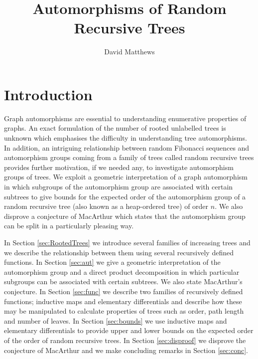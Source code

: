 
\DeclareMathOperator{\F}{\mathcal{F}}
\DeclareMathOperator{\R}{\mathcal{R}}
\DeclareMathOperator{\La}{\mathcal{L}}
\DeclareMathOperator{\V}{\mathcal{V}}
\DeclareMathOperator{\Aut}{Aut}
\usepackage{amssymb}
\title{Automorphisms of Random Recursive Trees}
\author{David Matthews}

\maketitle
\section{Introduction}
Graph automorphisms are essential to understanding enumerative properties of graphs.  An exact formulation of 
the number of rooted unlabelled trees is unknown \cite{harary} which emphasises the difficulty in understanding tree automorphisms.  
In addition, an intriguing 
relationship between random Fibonacci sequences and automorphism groups coming from a family of trees called random recursive 
trees \cite{macarthur2006} 
provides further motivation, if we needed any, to investigate automorphism groups of trees.  We exploit a geometric interpretation of 
a graph automorphism in which subgroups of the automorphism group are associated with certain subtrees to give bounds for the 
expected order of the automorphism group of a random recursive tree (also known as a heap-ordered tree) of order $n$. We also disprove a conjecture of MacArthur 
\cite{macarthur} which states that the automorphism group can be split in a particularly pleasing way.

In Section \ref{sec:RootedTrees} we introduce several families of increasing trees and we describe the relationship between them 
using several recursively defined functions.  In Section \ref{sec:aut} we give a geometric interpretation of the automorphism group and a 
direct product decomposition in which particular subgroups can be associated with certain subtrees. We also state MacArthur’s conjecture.  
In Section \ref{sec:func} we describe two families of recursively defined functions; inductive maps and elementary differentials and describe how these may be manipulated to calculate properties of trees such as order, path length and 
number of leaves.  In Section \ref{sec:bounds} we use inductive maps and elementary differentials to provide upper and lower bounds on the 
expected order of the order of random recursive trees.  In Section \ref{sec:disproof}  we disprove the conjecture 
of MacArthur and we make concluding remarks in Section \ref{sec:conc}.  



